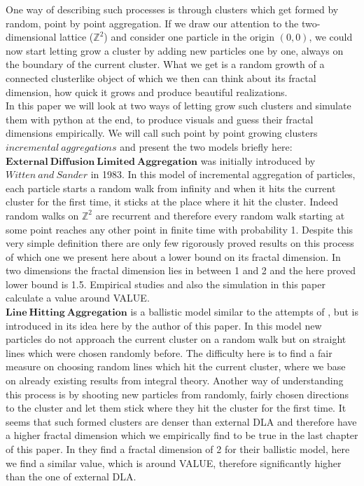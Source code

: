 \documentclass[12pt,a4paper]{scrartcl}
\numberwithin{equation}{subsection}
\newcommand{\Z}{\mathbb{Z}} %
\newcommand{\1}{\mathbbm{1}}
\numberwithin{equation}{section}
\theoremstyle{definition}
\begin{document}
	\noindent One way of describing such processes is through clusters which get formed by random, point by point aggregation. If we draw our attention to the two-dimensional lattice ($\Z^2$) and consider one particle in the origin $(0,0)$, we could now start letting grow a cluster by adding new particles one by one, always on the boundary of the current cluster. What we get is a random growth of a connected clusterlike object of which we then can think about its fractal dimension, how quick it grows and produce beautiful realizations. \\
	
	\noindent In this paper we will look at two ways of letting grow such clusters and simulate them with python at the end, to produce visuals and guess their fractal dimensions empirically. We will call such point by point growing clusters $\mathit{incremental\ aggregations}$ and present the two models briefly here:\\

	\noindent $\mathbf{External\ Diffusion\ Limited\ Aggregation}$ was initially introduced by $\mathit{Witten\ and\ Sander}$ \cite{wittensander} in 1983. In this model of incremental aggregation of particles, each particle starts a random walk from infinity and when it hits the current cluster for the first time, it sticks at the place where it hit the cluster. Indeed random walks on  $\Z^2$ are recurrent and therefore every random walk starting at some point reaches any other point in finite time with probability 1. Despite this very simple definition there are only few rigorously proved results on this process of which one we present here about a lower bound on its fractal dimension. In two dimensions the fractal dimension lies in between 1 and 2 and the here proved lower bound is 1.5. Empirical studies and also the simulation in this paper calculate a value around VALUE.  \\
	
	\noindent $\mathbf{Line\ Hitting\ Aggregation}$ is a ballistic model similar to the attempts of \cite{ballistic}, but is introduced in its idea here by the author of this paper. In this model new particles do not approach the current cluster on a random walk but on straight lines which were chosen randomly before. The difficulty here is to find a fair measure on choosing random lines which hit the current cluster, where we base on already existing results from integral theory. Another way of understanding this process is by shooting new particles from randomly, fairly chosen directions to the cluster and let them stick where they hit the cluster for the first time. It seems that such formed clusters are denser than external DLA and therefore have a higher fractal dimension which we empirically find to be true in the last chapter of this paper. In \cite{ballistic} they find a fractal dimension of 2 for their ballistic model, here we find a similar value, which is around VALUE, therefore significantly higher than the one of external DLA. \\
	
\end{document}
